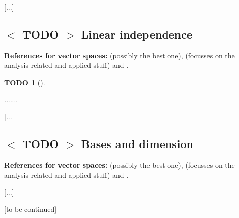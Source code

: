 \documentclass[numbers=enddot,12pt,final,onecolumn,notitlepage]{scrartcl}%
\theoremstyle{definition}
\newtheorem{quest}[theo]{TODO}
\newenvironment{todo}[1][]
{\begin{quest}[#1]\begin{leftbar}}
{\end{leftbar}\end{quest}}
\begin{document}
[...]

\subsection{%
$<$%
TODO%
$>$
Linear independence}

\textbf{References for vector spaces:} \cite[\S 5.2]{LaNaSc16} (possibly the
best one), \cite[\S 2.3]{OlvSha06} (focusses on the analysis-related and
applied stuff) and \cite[Two.II]{Heffer16}.

\begin{todo}
.......
\end{todo}

[...]

\subsection{%
$<$%
TODO%
$>$
Bases and dimension}

\textbf{References for vector spaces:} \cite[\S 5.3-5.4]{LaNaSc16} (possibly
the best one), \cite[\S 2.4]{OlvSha06} (focusses on the analysis-related and
applied stuff) and \cite[Two.III]{Heffer16}.

[...]

[to be continued]
\end{document}
